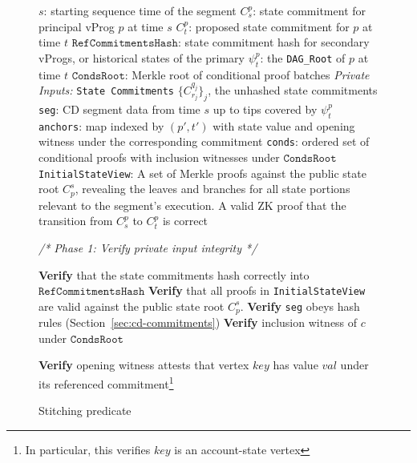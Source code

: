 \documentclass[onecolumn, 9pt, a4paper]{extarticle}
\begin{document}
\newpage
\begin{figure}[!t]
\begin{whitebgbox}
\begin{algorithm}[H]
\caption{Stitching predicate}\label{alg:stitching}
\begin{algorithmic}[1]
\Require
    \State $s$: starting sequence time of the segment
    \State $C_{s}^{p}$: state commitment for principal vProg $p$ at time $s$
    \State $C_{t}^{p}$: proposed state commitment for $p$ at time $t$
    \State $\texttt{RefCommitmentsHash}$: state commitment hash for secondary vProgs, or historical states of the primary
    \State $\psi_{t}^{p}$: the \texttt{DAG\_Root} of $p$ at time $t$
    \State $\texttt{CondsRoot}$: Merkle root of conditional proof batches
    \State \textit{Private Inputs:}
    \State \quad \texttt{State Commitments} $\{C_{r_j}^{q_j}\}_j$, the unhashed state commitments
    \State \quad \texttt{seg}: CD segment data from time $s$ up to tips covered by $\psi_{t}^{p}$
    \State \quad \texttt{anchors}: map indexed by $(p',t')$ with state value and opening witness under the corresponding commitment
    \State \quad \texttt{conds}: ordered set of conditional proofs with inclusion witnesses under $\texttt{CondsRoot}$
    \State \quad \texttt{InitialStateView}: A set of Merkle proofs against the public state root $C_p^s$, revealing the leaves and branches for all state portions relevant to the segment's execution.
\Ensure
    \State A valid ZK proof that the transition from $C_{s}^{p}$ to $C_{t}^{p}$ is correct

    \vspace{0.5em}
    \Statex \textit{ /* Phase 1: Verify private input integrity */}
    
    \State \textbf{Verify} that the state commitments hash correctly into $\texttt{RefCommitmentsHash}$
    \State \textbf{Verify} that all proofs in \texttt{InitialStateView} are valid against the public state root $C_p^s$.
    \State \textbf{Verify} \texttt{seg} obeys hash rules (Section~\ref{sec:cd-commitments}) 
        \State \textbf{Verify} inclusion witness of $c$ under $\texttt{CondsRoot}$
    \EndFor
    
     
        \State \textbf{Verify} opening witness attests that vertex $key$ has value $val$ under its referenced commitment\footnote{In particular, this verifies $key$ is an account-state vertex }
    \EndFor


\end{algorithmic}
\end{algorithm}
\end{whitebgbox}
\end{figure}
\end{document}
